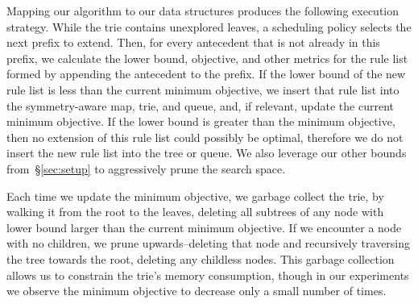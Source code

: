 Mapping our algorithm to our data structures produces the following execution strategy.
%
While the trie contains unexplored leaves, a scheduling policy selects the next prefix to extend.
%
Then, for every antecedent that is not already in this prefix, we calculate the lower bound,
objective, and other metrics for the rule list formed by appending the antecedent to the prefix.
%
If the lower bound of the new rule list is less than the current minimum objective, we insert that
rule list into the symmetry-aware map, trie, and queue, and, if relevant, update the
current minimum objective.
%
If the lower bound is greater than the minimum objective,
then no extension of this rule list could possibly be optimal,
therefore we do not insert the new rule list into the tree or queue.
%
We also leverage our other bounds from~\S\ref{sec:setup}
to aggressively prune the search space.

Each time we update the minimum objective, we garbage collect the trie, by walking it
from the root to the leaves, deleting all subtrees of any node with lower bound larger than the current
minimum objective. If we encounter a node with no children, we prune upwards--deleting that
node and recursively traversing the tree towards the root, deleting any childless nodes.
This garbage collection allows us to constrain the trie's memory consumption, though in our
experiments we observe the minimum objective to decrease only a small number of times.

\begin{kdd}
\vspace{-1mm}
\end{kdd}

